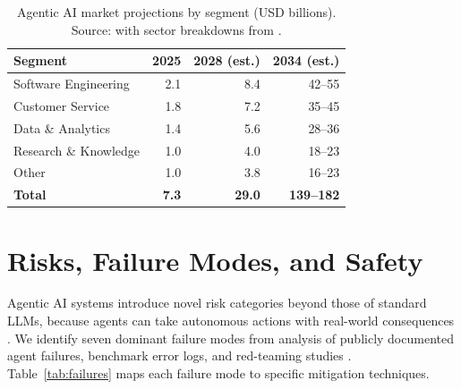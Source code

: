\documentclass[review]{elsarticle}
\theoremstyle{definition}
\begin{document}
\begin{table}[ht]
\centering
\caption{Agentic AI market projections by segment (USD billions). Source: \citet{grandview2025agentic} with sector breakdowns from \citet{mckinsey2024state}.}
\label{tab:market}
\begin{tabular}{lrrr}
\toprule
\textbf{Segment} & \textbf{2025} & \textbf{2028 (est.)} & \textbf{2034 (est.)} \\
\midrule
Software Engineering    & 2.1  & 8.4   & 42--55 \\
Customer Service        & 1.8  & 7.2   & 35--45 \\
Data \& Analytics       & 1.4  & 5.6   & 28--36 \\
Research \& Knowledge   & 1.0  & 4.0   & 18--23 \\
Other                   & 1.0  & 3.8   & 16--23 \\
\midrule
\textbf{Total}          & \textbf{7.3} & \textbf{29.0} & \textbf{139--182} \\
\bottomrule
\end{tabular}
\end{table}

\section{Risks, Failure Modes, and Safety}\label{sec:risks}

Agentic AI systems introduce novel risk categories beyond those of standard LLMs, because agents can take autonomous actions with real-world consequences \citep{amodei2016concrete,hendrycks2022xrisk}. We identify seven dominant failure modes from analysis of publicly documented agent failures, benchmark error logs, and red-teaming studies \citep{perez2022red,ruan2024identifying}. Table~\ref{tab:failures} maps each failure mode to specific mitigation techniques.
\end{document}
